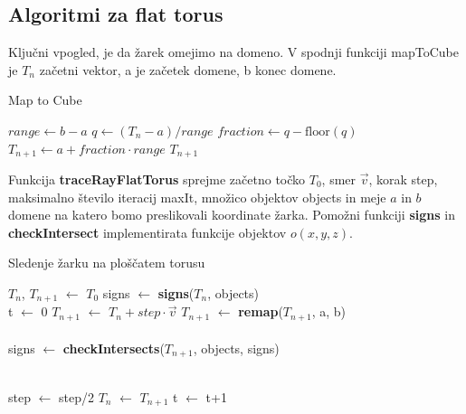 \documentclass[titlepage]{article}
\begin{document}
\subsection{Algoritmi za flat torus}
Ključni vpogled, je da žarek omejimo na domeno. V spodnji funkciji mapToCube je $T_{n}$ začetni vektor, a je začetek domene, b konec domene.
\begin{algorithm}[H]
\caption{Map to Cube}\label{alg:mapToCube}
\begin{algorithmic}[1]
    \State $range \gets b - a$
    \State $q \gets (T_{n} - a) / range$
    \State $fraction \gets q - \text{floor}(q)$
    \State $T_{n+1} \gets a + fraction \cdot range$
    \State \Return $T_{n+1}$
\EndFunction
\end{algorithmic}
\end{algorithm}

Funkcija \textbf{traceRayFlatTorus} sprejme začetno točko $T_{0}$, smer $\vec{v}$, korak step, maksimalno število iteracij maxIt, množico objektov objects in meje $a$ in $b$ domene na katero bomo preslikovali koordinate žarka.
Pomožni funkciji \textbf{signs} in \textbf{checkIntersect} implementirata funkcije objektov \( o(x,y,z) \).
\begin{algorithm}[H]
    \caption{Sledenje žarku na ploščatem torusu}
\begin{algorithmic}

    \State $T_{n}$, $T_{n+1}$ $\gets$ $T_{0}$
    \State signs $\gets$ \textbf{signs}($T_{n}$, objects)
    \\
    \State t $\gets$ 0
      \State {}
      \State {}
    \EndIf
    \State $T_{n+1}$ $\gets$ $T_{n}+step \cdot \vec{v}$
    \State $T_{n+1}$ $\gets$ \textbf{remap}($T_{n+1}$, a, b)
    \\
    \\
    \State signs $\gets$ \textbf{checkIntersects}($T_{n+1}$, objects, signs)
    \\
    \\

        \State step $\gets$ step/2
    \Else
      \State $T_{n}$ $\gets$ $T_{n+1}$
      \State t $\gets$ t+1
    \EndIf
  \EndWhile
\EndFunction
\end{algorithmic}
\end{algorithm}
\end{document}
